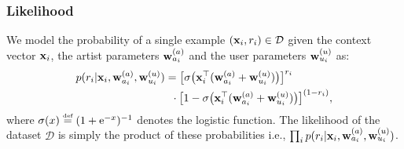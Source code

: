 \subsubsection{Likelihood}
We model the probability of a single example $(\mathbf{x}_i, r_i) \in \mathcal{D}$ given the context vector $\mathbf{x}_i$,
the artist parameters $\mathbf{w}^{(a)}_{a_i}$ and the user parameters $\mathbf{w}^{(u)}_{u_i}$  as:
\begin{align}
 p( r_i | \mathbf{x}_i , \mathbf{w}^{(a)}_{a_i}, \mathbf{w}^{(u)}_{u_i} )
& =  \big[ \sigma \big( \mathbf{x}_i^\top ( \mathbf{w}^{(a)}_{a_i} + \mathbf{w}^{(u)}_{u_i} ) \big) \big]^{r_i} \nonumber \\ 
& \ \:  \cdot \big[ 1 - \sigma \big( \mathbf{x}_i^\top ( \mathbf{w}^{(a)}_{a_i} + \mathbf{w}^{(u)}_{u_i} ) \big) \big]^{(1-r_i)} ,
\label{eq:likelihood}
\end{align}
where  $\sigma(x) \defined (1 + \mathrm{e}^{-x})^{-1}$ denotes the logistic function.
The likelihood of the dataset $\mathcal{D}$ is simply the product of these probabilities i.e., $\prod_i p( r_i | \mathbf{x}_i , \mathbf{w}^{(a)}_{a_i}, \mathbf{w}^{(u)}_{u_i})$.


\newpage
